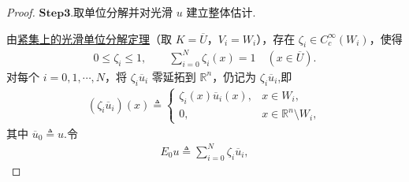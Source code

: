 \documentclass[../../main.tex]{subfiles}
\begin{document}
\begin{proof}
\noindent$\mathbf{Step}\bm{3}$.{\heiti 取单位分解并对光滑 $u$ 建立整体估计.}

由\hyperref[corollary:紧集上的光滑单位分解定理]{紧集上的光滑单位分解定理}（取 $K=\overline{U}$，$V_i=W_i$），存在 $\zeta_i\in C_c^{\infty}(W_i)$，使得
\begin{align*}
0\leqslant\zeta_i\leqslant1,\qquad
\sum_{i=0}^{N}\zeta_i(x)=1\quad(x\in\overline{U}).
\end{align*}
对每个 $i=0,1,\cdots,N$，将 $\zeta_i\overline{u}_i$ 零延拓到 $\mathbb{R}^n$，仍记为 $\zeta_i\overline{u}_i$,即
\begin{align*}
(\zeta_i\overline{u}_i)(x)\triangleq
\begin{cases}
\zeta_i(x)\overline{u}_i(x), & x\in W_i,\\[2mm]
0, & x\in\mathbb{R}^n\setminus W_i,
\end{cases}
\end{align*}
其中 $\overline{u}_0\triangleq u$.令
\begin{align*}
E_0u\triangleq\sum_{i=0}^{N}\zeta_i\overline{u}_i,
\end{align*}


\end{proof}
\end{document}
